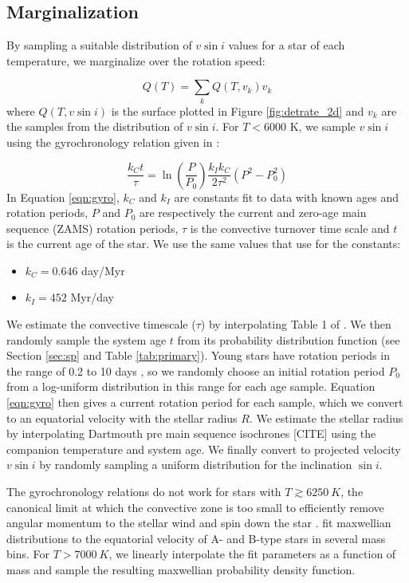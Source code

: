 \documentclass{emulateapj}
\begin{document}
\subsection{Marginalization}
By sampling a suitable distribution of $v\sin{i}$ values for a star of each temperature, we marginalize over the rotation speed:

\begin{equation}
Q(T) = \sum_k Q(T, v_k) v_k 
\end{equation} 
where $Q(T, v\sin{i})$ is the surface plotted in Figure \ref{fig:detrate_2d} and $v_k$ are the samples from the distribution of $v\sin{i}$. For $T < 6000$ K, we sample $v\sin{i}$ using the gyrochronology relation given in \citet{Barnes2010b}:

\begin{equation}
\frac{k_Ct}{\tau} = \ln\left ( \frac{P}{P_0} \right ) \frac{k_Ik_C}{2\tau^2} (P^2 - P_0^2)
\label{eqn:gyro}
\end{equation}
In Equation \ref{eqn:gyro}, $k_C$ and $k_I$ are constants fit to data with known ages and rotation periods, $P$ and $P_0$ are respectively the current and zero-age main sequence (ZAMS) rotation periods, $\tau$ is the convective turnover time scale and $t$ is the current age of the star. We use the same values that \cite{Barnes2010b} use for the constants:

\begin{itemize}
\item $k_C = 0.646$ day/Myr
\item $k_I = 452$ Myr/day
\end{itemize}
We estimate the convective timescale ($\tau$) by interpolating Table 1 of \citet{Barnes2010a}. We then randomly sample the system age $t$ from its probability distribution function (see Section \ref{sec:sp} and Table \ref{tab:primary}). Young stars have rotation periods in the range of 0.2 to 10 days \citep{Bouvier2014}, so we randomly choose an initial rotation period $P_0$ from a log-uniform distribution in this range for each age sample. Equation \ref{eqn:gyro} then gives a current rotation period for each sample, which we convert to an equatorial velocity with the stellar radius $R$. We estimate the stellar radius by interpolating Dartmouth pre main sequence isochrones [CITE] using the companion temperature and system age. We finally convert to projected velocity $v\sin{i}$ by randomly sampling a uniform distribution for the inclination $\sin{i}$.

The gyrochronology relations do not work for stars with $T \gtrsim 6250\ K$, the canonical limit at which the convective zone is too small to efficiently remove angular momentum to the stellar wind and spin down the star \citep{Pinsonneault2001}. \citet{Zorec2012} fit maxwellian distributions to the equatorial velocity of A- and B-type stars in several mass bins. For $T > 7000\ K$, we linearly interpolate the fit parameters as a function of mass and sample the resulting maxwellian probability density function. 
\end{document}
